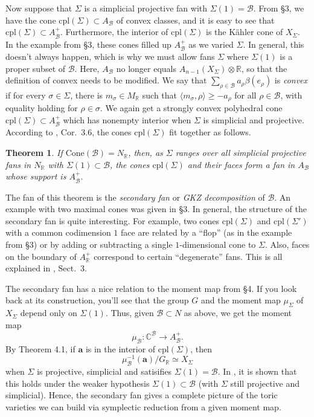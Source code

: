 \documentclass{amsart}
\theoremstyle{plain}
\newtheorem{theorem}{Theorem}[section]
\theoremstyle{definition}
\begin{document}
	Now suppose that $\Sigma$ is a simplicial projective fan with
$\Sigma(1) = \mathcal{B}$.  From \S3, we have the cone
$\mathrm{cpl}(\Sigma) \subset A_{\mathcal{B}}$ of convex classes, and it is
easy to see that $\mathrm{cpl}(\Sigma) \subset A^+_{\mathcal{B}}$.
Furthermore, the interior of $\mathrm{cpl}(\Sigma)$ is the K\"ahler
cone of $X_\Sigma$.  In the example from \S3, these cones filled up
$A^+_{\mathcal{B}}$ as we varied $\Sigma$.  In general, this doesn't
always happen, which is why we must allow fans
$\Sigma$ where $\Sigma(1)$ is a proper subset of $\mathcal{B}$.  Here,
$A_{\mathcal{B}}$ no longer equals $A_{n-1}(X_\Sigma)\otimes\mathbb{R}$, so
that the definition of convex needs to be modified.  We say that
$\sum_{\rho\in\mathcal{B}} a_\rho \beta(e_\rho)$ is {\it convex\/} if for
every $\sigma \in \Sigma$, there is $m_\sigma \in M_\mathbb{R}$ such
that $\langle m_\sigma,\rho\rangle \ge -a_\rho$ for all $\rho \in
\mathcal{B}$, with equality holding for $\rho \in \sigma$.  We again get a
strongly convex polyhedral cone $\mathrm{cpl}(\Sigma) \subset
A^+_{\mathcal{B}}$ which has nonempty interior when $\Sigma$ is simplicial
and projective.  According to \cite{OP}, Cor.~3.6, the cones
$\mathrm{cpl}(\Sigma)$ fit together as follows.

\begin{theorem} If $\mathrm{Cone}(\mathcal{B}) = N_\mathbb{R}$, then,
as $\Sigma$ ranges over all simplicial projective fans in $N_\mathbb{R}$
with $\Sigma(1) \subset \mathcal{B}$, the cones $\mathrm{cpl}(\Sigma)$ and
their faces form a fan in $A_{\mathcal{B}}$ whose support is
$A^+_{\mathcal{B}}$.
\end{theorem}
	
	The fan of this theorem is the {\it secondary fan\/} or {\it
GKZ decomposition\/} of $\mathcal{B}$.  An example with two maximal cones
was given in \S3.  In general, the structure of the secondary fan is
quite interesting.  For example, two cones $\mathrm{cpl}(\Sigma)$ and
$\mathrm{cpl}(\Sigma')$ with a common codimension $1$ face are related
by a ``flop'' (as in the example from \S3) or by adding or subtracting
a single $1$-dimensional cone to $\Sigma$.  Also, faces on the
boundary of $A^+_\mathbb{R}$ correspond to certain ``degenerate'' fans.
This is all explained in \cite{OP}, Sect.~3.

	The secondary fan has a nice relation to the moment map from
\S4.  If you look back at its construction, you'll see that the group
$G$ and the moment map $\mu_\Sigma$ of $X_\Sigma$ depend only on
$\Sigma(1)$.  Thus, given $\mathcal{B} \subset N$ as above, we get the
moment map
\[
\mu_{\mathcal{B}} : \mathbb{C}^{\mathcal{B}} \longrightarrow A^+_{\mathcal{B}}.
\]
By Theorem 4.1, if $\mathbf{a}$ is in the interior of
$\mathrm{cpl}(\Sigma)$, then
\[
\mu_{\mathcal{B}}^{-1}(\mathbf{a})/G_\mathbb{R} \simeq X_\Sigma
\]
when $\Sigma$ is projective, simplicial and satisifies $\Sigma(1) =
\mathcal{B}$.  In \cite{CK}, it is shown that this holds under the weaker
hypothesis $\Sigma(1) \subset \mathcal{B}$ (with $\Sigma$ still projective
and simplicial).  Hence, the secondary fan gives a complete picture of
the toric varieties we can build via symplectic reduction from a given
moment map.  
\end{document}
